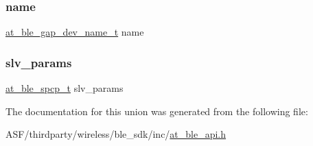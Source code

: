 \mbox{\label{unionat__ble__gapc__dev__info__val__t_a3f127c06ed9fc788bfcea253ab0b9d43}} 
\subsubsection{\texorpdfstring{name}{name}}
{\footnotesize\ttfamily \mbox{\hyperlink{structat__ble__gap__dev__name__t}{at\+\_\+ble\+\_\+gap\+\_\+dev\+\_\+name\+\_\+t}} name}

\mbox{\label{unionat__ble__gapc__dev__info__val__t_a4bc48c20ac9f987e7c458fa3bca69e7b}} 
\subsubsection{\texorpdfstring{slv\_params}{slv\_params}}
{\footnotesize\ttfamily \mbox{\hyperlink{structat__ble__spcp__t}{at\+\_\+ble\+\_\+spcp\+\_\+t}} slv\+\_\+params}



The documentation for this union was generated from the following file\+:\begin{DoxyCompactItemize}
\item 
A\+S\+F/thirdparty/wireless/ble\+\_\+sdk/inc/\mbox{\hyperlink{at__ble__api_8h}{at\+\_\+ble\+\_\+api.\+h}}\end{DoxyCompactItemize}

